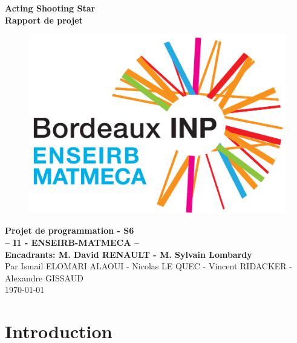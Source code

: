 \documentclass{article}
\begin{document}
\begin {titlepage}
  \begin{center}
      \vspace*{1cm}
    \Large{\textbf{Acting Shooting Star}}\\
    \Large{\textbf{Rapport de projet}}
    \vfill
    \begin{figure}[h]
        \centering
        \includegraphics[scale=0.5]{MATMECA.PNG}
    \end{figure}
    \vfill    
    
    \huge{\textbf{Projet de programmation - S6}}\\[3mm]
    \Large{\textbf{-- I1 - ENSEIRB-MATMECA --}}\\[1mm]
    \Large{\textbf{Encadrants: M. David RENAULT - M. Sylvain Lombardy  }}\\[1mm]    
    \vfill
    Par Ismail ELOMARI ALAOUI - Nicolas LE QUEC - Vincent RIDACKER - Alexandre GISSAUD\\
    \today\\
  \end{center}
\end{titlepage}



 \tableofcontents
\clearpage
\newpage

\section*{Introduction}
\end{document}
